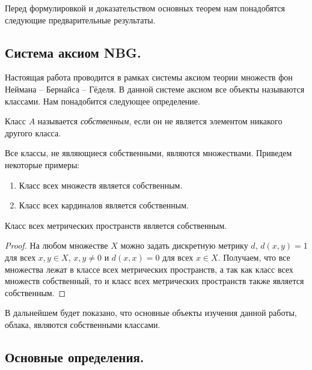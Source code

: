 Перед формулировкой и доказательством основных теорем нам понадобятся
следующие предварительные результаты.
\subsection{Система аксиом NBG.}
Настоящая работа проводится в рамках системы аксиом теории множеств
фон Неймана -- Бернайса -- Гёделя. В данной системе аксиом все
объекты называются классами. Нам понадобится следующее определение.
\begin{definition}
  Класс \( A \) называется \emph{собственным}, если он не является
  элементом никакого другого класса.
\end{definition}
Все классы, не являющиеся собственными, являются множествами.
Приведем некоторые примеры:
\begin{enumerate}
  \item Класс всех множеств является собственным.
  \item Класс всех кардиналов является собственным.
\end{enumerate}
\begin{lemma}
  Класс всех метрических пространств является собственным.
\end{lemma}
\begin{proof}
  На любом множестве \( X \) можно задать дискретную метрику \( d \),
  \( d(x,y) = 1 \) для всех \( x,y \in X \), \( x,y\neq 0 \) и \(
  d(x,x) = 0 \) для всех \( x\in X \). Получаем, что все множества
  лежат в классе всех метрических пространств, а так как класс всех
  множеств собственный, то и класс всех метрических пространств также
  является собственным.
\end{proof}
В дальнейшем будет показано, что основные объекты изучения данной
работы, облака, являются собственными классами.
\subsection{Основные определения.}

